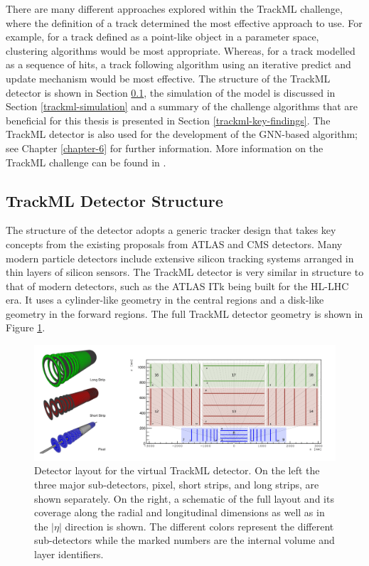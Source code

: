 There are many different approaches explored within the TrackML challenge, where the definition of a track determined the most effective approach to use. For example, for a track defined as a point-like object in a parameter space, clustering algorithms would be most appropriate. Whereas, for a track modelled as a sequence of hits, a track following algorithm using an iterative predict and update mechanism would be most effective. The structure of the TrackML detector is shown in Section \ref{trackml-structure}, the simulation of the model is discussed in Section \ref{trackml-simulation} and a summary of the challenge algorithms that are beneficial for this thesis is presented in Section \ref{trackml-key-findings}. The TrackML detector is also used for the development of the GNN-based algorithm; see Chapter \ref{chapter-6} for further information. More information on the TrackML challenge can be found in \cite{Amrouche_2019}.

\subsection{TrackML Detector Structure}
\label{trackml-structure}
The structure of the detector adopts a generic tracker design that takes key concepts from the existing proposals from ATLAS and CMS detectors. Many modern particle detectors include extensive silicon tracking systems arranged in thin layers of silicon sensors. The TrackML detector is very similar in structure to that of modern detectors, such as the ATLAS ITk \cite{inner-detector-TDR} being built for the HL-LHC era. It uses a cylinder-like geometry in the central regions and a disk-like geometry in the forward regions. The full TrackML detector geometry is shown in Figure \ref{fig:trackml-detector-image}. 


\begin{figure}[!htbp]
  \centering
  \includegraphics[width=\textwidth]{images/3-track-reconstruction/trackml-detector.png}
  \caption{
    Detector layout for the virtual TrackML detector. On the left the three major sub-detectors, pixel, short strips, and long strips, are shown separately. On the right, a schematic of the full layout and its coverage along the radial and longitudinal dimensions as well as in the $ \lvert \eta \rvert$ direction is shown. The different colors represent the different sub-detectors while the marked numbers are the internal volume and layer identifiers.
  }
  \label{fig:trackml-detector-image}
\end{figure}



